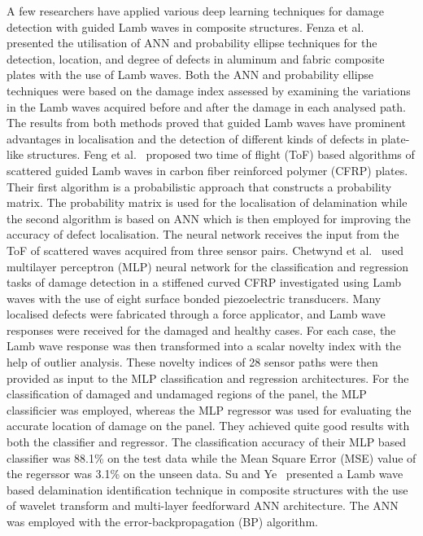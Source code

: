 A few researchers have applied various deep learning techniques for damage detection with guided Lamb waves in composite structures. 
Fenza et al.~\cite{de2015application} presented the utilisation of ANN and probability ellipse techniques for the detection, location, and degree of defects in aluminum and fabric composite plates with the use of Lamb waves. 
Both the ANN and probability ellipse techniques were based on the damage index assessed by examining the variations in the Lamb waves acquired before and after the damage in each analysed path. 
The results from both methods proved that guided Lamb waves have prominent advantages in localisation and the detection of different kinds of defects in plate-like structures. 
Feng et al.~\cite{feng2019locating} proposed two time of flight (ToF) based algorithms of scattered guided Lamb waves in carbon fiber reinforced polymer (CFRP) plates. 
Their first algorithm is a probabilistic approach that constructs a probability matrix. The probability matrix is used for the localisation of delamination while the second algorithm is based on ANN which is then employed for improving the accuracy of defect localisation. 
The neural network receives the input from the ToF of scattered waves acquired from three sensor pairs.
Chetwynd et al.~\cite{chetwynd2008damage} used multilayer perceptron (MLP) neural network for the classification and regression tasks of damage detection in a stiffened curved CFRP investigated using Lamb waves with the use of eight surface bonded piezoelectric transducers. 
Many localised defects were fabricated through a force applicator, and Lamb wave responses were received for the damaged and healthy cases. 
For each case, the Lamb wave response was then transformed into a scalar novelty index with the help of outlier analysis. 
These novelty indices of 28 sensor paths were then provided as input to the MLP classification and regression architectures. 
For the classification of damaged and undamaged regions of the panel, the MLP classificier was employed, whereas the MLP regressor was used for evaluating the accurate location of damage on the panel. 
They achieved quite good results with both the classifier and regressor. 
The classification accuracy of their MLP based classifier was 88.1\% on the test data while the Mean Square Error (MSE) value of the regerssor was 3.1\% on the unseen data. Su and Ye~\cite{su2004lamb} presented a Lamb wave based delamination identification technique in composite structures with the use of wavelet transform and multi-layer feedforward ANN architecture. 
The ANN was employed with the error-backpropagation (BP) algorithm. 
